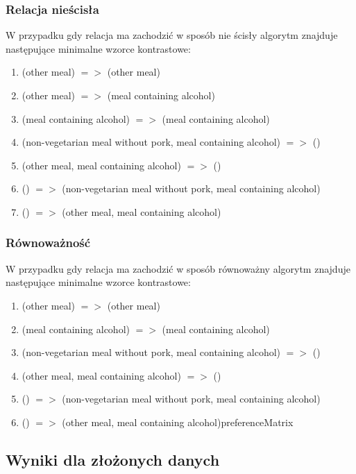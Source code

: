 \documentclass[a4paper,12pt]{article}
\begin{document}
\subsubsection{Relacja nieścisła}

W przypadku gdy relacja ma zachodzić w sposób nie ścisły algorytm znajduje następujące minimalne wzorce kontrastowe:

\begin{enumerate}
\item (other meal) $=>$ (other meal)
\item (other meal) $=>$ (meal containing alcohol)
\item (meal containing alcohol) $=>$ (meal containing alcohol)
\item (non-vegetarian meal without pork, meal containing alcohol) $=>$ ()
\item (other meal, meal containing alcohol) $=>$ ()
\item () $=>$ (non-vegetarian meal without pork, meal containing alcohol)
\item () $=>$ (other meal, meal containing alcohol)
\end{enumerate}

\subsubsection{Równoważność}

W przypadku gdy relacja ma zachodzić w sposób równoważny algorytm znajduje następujące minimalne wzorce kontrastowe:

\begin{enumerate}
\item (other meal) $=>$ (other meal)
\item (meal containing alcohol) $=>$ (meal containing alcohol)
\item (non-vegetarian meal without pork, meal containing alcohol) $=>$ ()
\item (other meal, meal containing alcohol) $=>$ ()
\item () $=>$ (non-vegetarian meal without pork, meal containing alcohol)
\item () $=>$ (other meal, meal containing alcohol)preferenceMatrix
\end{enumerate}

\subsection{Wyniki dla złożonych danych}
\end{document}
